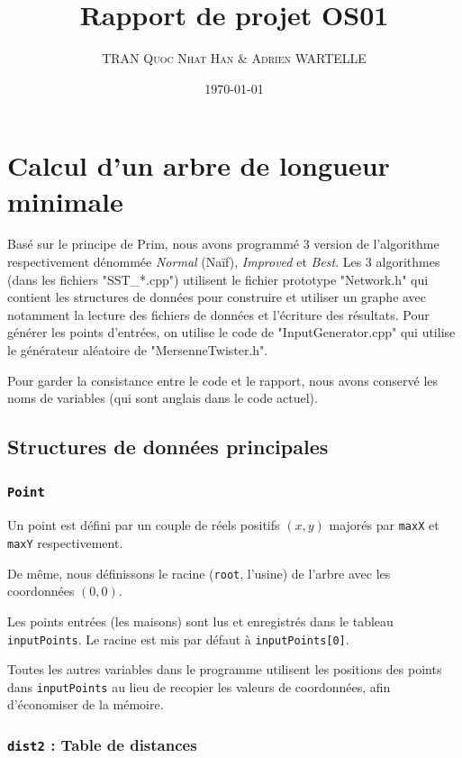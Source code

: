 \documentclass[10pt,a4paper]{article}
\author{\textsc{TRAN Quoc Nhat Han} \& \textsc{Adrien WARTELLE}}
\title{Rapport de projet OS01}
\date{\today}
\begin{document}
\maketitle
\renewcommand{\contentsname}{Sommaire}
\tableofcontents
\clearpage

\section{Calcul d'un arbre de longueur minimale}

Basé sur le principe de Prim, nous avons programmé 3 version de l'algorithme  respectivement dénommée \emph{Normal} (Naïf), \emph{Improved} et \emph{Best}. Les 3 algorithmes (dans les fichiers "SST\_{}*.cpp") utilisent le fichier prototype
"Network.h" qui contient les structures de données pour construire et utiliser un graphe avec notamment la lecture des fichiers de données et l'écriture des résultats. Pour générer les points d'entrées, on utilise le code de "InputGenerator.cpp" qui utilise le générateur aléatoire de "MersenneTwister.h".  

Pour garder la consistance entre le code et le rapport, nous avons conservé les noms de variables (qui sont anglais dans le code actuel).



\subsection{Structures de données principales}

\subsubsection{\texttt{Point}}

Un point est défini par un couple de réels positifs $(x, y)$ majorés par \texttt{maxX} et \texttt{maxY} respectivement.

De même, nous définissons le racine (\texttt{root}, l'usine) de l'arbre avec les coordonnées $(0, 0)$.

Les points entrées (les maisons) sont lus et enregistrés dans le tableau \texttt{inputPoints}. Le racine est mis par défaut à \texttt{inputPoints[0]}.

Toutes les autres variables dans le programme utilisent les positions des points dans \texttt{inputPoints} au lieu de recopier les valeurs de coordonnées, afin d'économiser de la mémoire.

\subsubsection{\texttt{dist2} : Table de distances}
\end{document}
